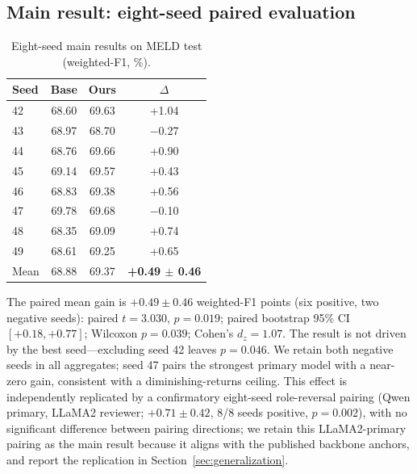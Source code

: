 \documentclass[final,5p,times,twocolumn]{elsarticle}
\begin{document}
\subsection{Main result: eight-seed paired evaluation}
\begin{table}[t]
\centering
\caption{Eight-seed main results on MELD test (weighted-F1, \%).}
\label{tab:main}
\begin{tabular}{lccc}
\toprule
Seed & Base & Ours & $\Delta$ \\
\midrule
42 & 68.60 & 69.63 & +1.04 \\
43 & 68.97 & 68.70 & $-$0.27 \\
44 & 68.76 & 69.66 & +0.90 \\
45 & 69.14 & 69.57 & +0.43 \\
46 & 68.83 & 69.38 & +0.56 \\
47 & 69.78 & 69.68 & $-$0.10 \\
48 & 68.35 & 69.09 & +0.74 \\
49 & 68.61 & 69.25 & +0.65 \\
\midrule
Mean & 68.88 & 69.37 & \textbf{+0.49 $\pm$ 0.46} \\
\bottomrule
\end{tabular}
\end{table}
The paired mean gain is $+0.49\pm0.46$ weighted-F1 points (six positive,
two negative seeds): paired $t{=}3.030$, $p{=}0.019$; paired bootstrap 95\%
CI $[+0.18,+0.77]$; Wilcoxon $p{=}0.039$; Cohen's $d_z{=}1.07$. The result is
not driven by the best seed---excluding seed 42 leaves $p{=}0.046$. We retain
both negative seeds in all aggregates; seed 47 pairs the strongest primary
model with a near-zero gain, consistent with a diminishing-returns ceiling.
This effect is independently replicated by a confirmatory eight-seed
role-reversal pairing (Qwen primary, LLaMA2 reviewer; $+0.71 \pm 0.42$,
8/8 seeds positive, $p{=}0.002$), with no significant difference between
pairing directions; we retain this LLaMA2-primary pairing as the main
result because it aligns with the published backbone anchors, and report
the replication in Section~\ref{sec:generalization}.
\end{document}
